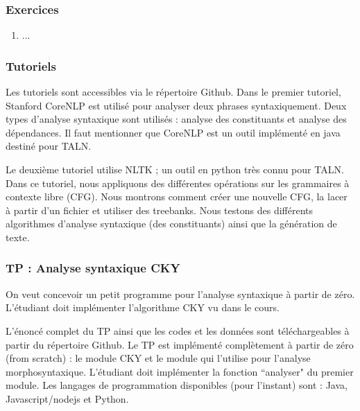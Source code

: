 \documentclass{KodeBook}
\begin{document}

\subsubsection*{Exercices}

\begin{enumerate}
	\item ...
	
\end{enumerate}

\subsubsection*{Tutoriels}

Les tutoriels sont accessibles via le répertoire Github.
Dans le premier tutoriel, Stanford CoreNLP est utilisé pour analyser deux phrases syntaxiquement.
Deux types d'analyse syntaxique sont utilisés : analyse des constituants et analyse des dépendances.
Il faut mentionner que CoreNLP est un outil implémenté en java destiné pour TALN.

Le deuxième tutoriel utilise NLTK ; un outil en python très connu pour TALN.
Dans ce tutoriel, nous appliquons des différentes opérations sur les grammaires à contexte libre (CFG).
Nous montrons comment créer une nouvelle CFG, la lacer à partir d'un fichier et utiliser des treebanks.
Nous testons des différents algorithmes d'analyse syntaxique (des constituants) ainsi que la génération de texte.


\subsubsection*{TP : Analyse syntaxique CKY}

On veut concevoir un petit programme pour l'analyse syntaxique à partir de zéro. 
L'étudiant doit implémenter l'algorithme CKY vu dans le cours.

L'énoncé complet du TP ainsi que les codes et les données sont téléchargeables à partir du répertoire Github.
Le TP est implémenté complètement à partir de zéro (from scratch) : le module CKY et le module qui l'utilise pour l'analyse morphosyntaxique. 
L'étudiant doit implémenter la fonction ``analyser" du premier module.
Les langages de programmation disponibles (pour l'instant) sont : Java, Javascript/nodejs et Python.
\end{document}
